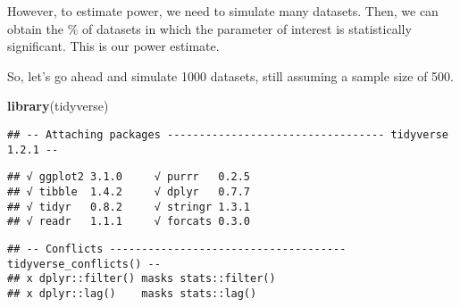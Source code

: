 \documentclass[]{article}
\newenvironment{Shaded}{\begin{snugshade}}{\end{snugshade}}
\newcommand{\KeywordTok}[1]{\textcolor[rgb]{0.13,0.29,0.53}{\textbf{#1}}}
\newcommand{\NormalTok}[1]{#1}
\begin{document}
However, to estimate power, we need to simulate many datasets. Then, we
can obtain the \% of datasets in which the parameter of interest is
statistically significant. This is our power estimate.

So, let's go ahead and simulate 1000 datasets, still assuming a sample
size of 500.

\begin{Shaded}
\begin{Highlighting}[]
\KeywordTok{library}\NormalTok{(tidyverse)}
\end{Highlighting}
\end{Shaded}

\begin{verbatim}
## -- Attaching packages ---------------------------------- tidyverse 1.2.1 --
\end{verbatim}

\begin{verbatim}
## √ ggplot2 3.1.0     √ purrr   0.2.5
## √ tibble  1.4.2     √ dplyr   0.7.7
## √ tidyr   0.8.2     √ stringr 1.3.1
## √ readr   1.1.1     √ forcats 0.3.0
\end{verbatim}

\begin{verbatim}
## -- Conflicts ------------------------------------- tidyverse_conflicts() --
## x dplyr::filter() masks stats::filter()
## x dplyr::lag()    masks stats::lag()
\end{verbatim}
\end{document}
